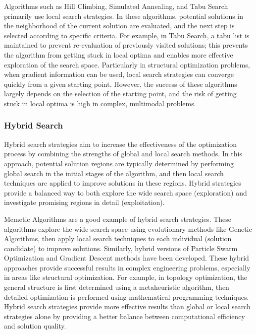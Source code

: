 Algorithms such as Hill Climbing, Simulated Annealing, and Tabu Search primarily use local search strategies. In these algorithms, potential solutions in the neighborhood of the current solution are evaluated, and the next step is selected according to specific criteria. For example, in Tabu Search, a tabu list is maintained to prevent re-evaluation of previously visited solutions; this prevents the algorithm from getting stuck in local optima and enables more effective exploration of the search space. Particularly in structural optimization problems, when gradient information can be used, local search strategies can converge quickly from a given starting point. However, the success of these algorithms largely depends on the selection of the starting point, and the risk of getting stuck in local optima is high in complex, multimodal problems.

\subsubsection{Hybrid Search}

Hybrid search strategies aim to increase the effectiveness of the optimization process by combining the strengths of global and local search methods. In this approach, potential solution regions are typically determined by performing global search in the initial stages of the algorithm, and then local search techniques are applied to improve solutions in these regions. Hybrid strategies provide a balanced way to both explore the wide search space (exploration) and investigate promising regions in detail (exploitation).

Memetic Algorithms are a good example of hybrid search strategies. These algorithms explore the wide search space using evolutionary methods like Genetic Algorithms, then apply local search techniques to each individual (solution candidate) to improve solutions. Similarly, hybrid versions of Particle Swarm Optimization and Gradient Descent methods have been developed. These hybrid approaches provide successful results in complex engineering problems, especially in areas like structural optimization. For example, in topology optimization, the general structure is first determined using a metaheuristic algorithm, then detailed optimization is performed using mathematical programming techniques. Hybrid search strategies provide more effective results than global or local search strategies alone by providing a better balance between computational efficiency and solution quality.

